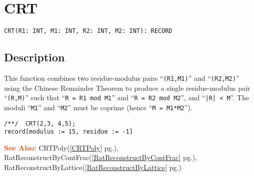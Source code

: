 \documentclass[a4paper]{mybook}
\newenvironment{command}{}{} %
\newcommand\SeeAlso{\par\textcolor{OrangeRed}{\textbf{\large See Also: }}}
\begin{document}
\section{CRT}
\label{CRT}
\begin{command} %


\begin{Verbatim}[label=syntax, rulecolor=\color{MidnightBlue},
frame=single]
CRT(R1: INT, M1: INT, R2: INT, M2: INT): RECORD
\end{Verbatim}


\subsection*{Description}

This function combines two residue-modulus pairs ``\verb&(R1,M1)&'' and ``\verb&(R2,M2)&''
using the Chinese Remainder Theorem to produce a single residue-modulus
pair ``\verb&(R,M)&'' such that ``\verb&R = R1 mod M1&'' and ``\verb&R = R2 mod M2&'', and ``\verb&|R| < M&''.
The moduli ``\verb&M1&'' and ``\verb&M2&'' must be coprime (hence ``\verb&M = M1*M2&'').
\begin{Verbatim}[label=example, rulecolor=\color{PineGreen}, frame=single]
/**/  CRT(2,3, 4,5);
record[modulus := 15, residue := -1]
\end{Verbatim}


\SeeAlso %
  CRTPoly(\ref{CRTPoly} pg.\pageref{CRTPoly}), 
    RatReconstructByContFrac(\ref{RatReconstructByContFrac} pg.\pageref{RatReconstructByContFrac}), 
    RatReconstructByLattice(\ref{RatReconstructByLattice} pg.\pageref{RatReconstructByLattice})
\end{command} %
\end{document}
